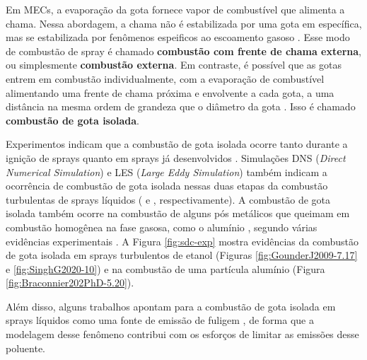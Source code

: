Em MECs, a evaporação da gota fornece vapor de combustível que alimenta a chama.
Nessa abordagem, a chama não é estabilizada por uma gota em específica, mas se estabilizada por fenômenos espeificos ao escoamento gasoso \cite{ChiuH1982,Law2006}.
Esse modo de combustão de spray é chamado \textbf{combustão com frente de chama externa}, ou simplesmente \textbf{combustão externa}.
Em contraste, é possível que as gotas entrem em combustão individualmente, com a evaporação de combustível alimentando uma frente de chama próxima e envolvente a cada gota, a uma distância na mesma ordem de grandeza que o diâmetro da gota \cite{ChiuH1977}.
Isso é chamado \textbf{combustão de gota isolada}.

Experimentos indicam que a combustão de gota isolada ocorre tanto durante a ignição	de sprays \cite{AggarwalS2014} quanto em sprays já desenvolvidos \cite{ChenG1996CF,SinghG2020,GounderJ2009PhD}.
Simulações DNS (\emph{Direct Numerical Simulation}) e LES (\emph{Large Eddy Simulation}) também indicam a ocorrência de combustão de gota isolada nessas duas etapas da combustão turbulentas de sprays líquidos (\cite{BorghesiG2013CF} e \cite{PaulhiacD2020,BojkoDesJardin2017CF}, respectivamente).
A combustão de gota isolada também ocorre na combustão de alguns pós metálicos que queimam em combustão homogênea na fase gasosa, como o alumínio \cite{Bergthorson2015,Julien2017,Baumann2020}, segundo várias evidências experimentais \cite{Braconnier2020Pre,Braconnier2022,Bucher1999,Halter2023}.
A Figura \ref{fig:sdc-exp} mostra evidências da combustão de gota isolada em sprays turbulentos de etanol (Figuras \ref{fig:GounderJ2009-7.17} e \ref{fig:SinghG2020-10}) e na combustão de uma partícula alumínio (Figura \ref{fig:Braconnier202PhD-5.20}). %

Além disso, alguns trabalhos apontam para a combustão de gota isolada em sprays líquidos como uma fonte de emissão de fuligem \cite[e referências 3-13 \emph{loc. cit.}]{FachiniF2005}, de forma que a modelagem desse fenômeno contribui com os esforços de limitar as emissões desse poluente.


